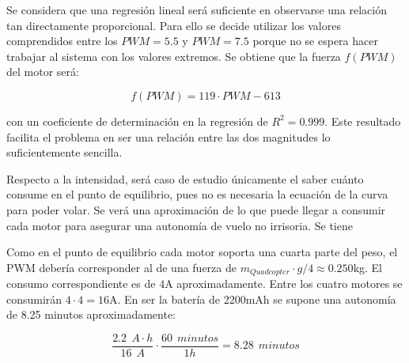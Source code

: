 \documentclass[twoside,11pt]{report}
\begin{document}
Se considera que una regresión lineal será suficiente en observarse una relación tan directamente proporcional. Para ello se decide utilizar los valores comprendidos entre los $PWM=5.5$ y $PWM=7.5$ porque no se espera hacer trabajar al sistema con los valores extremos.  Se obtiene que la fuerza $f(PWM)$ del motor será:

\begin{equation}
f(PWM)=119 \cdot PWM - 613
\end{equation}

con un coeficiente de determinación en la regresión de  $R^2=0.999$. Este resultado facilita el problema en ser una relación entre las dos magnitudes lo suficientemente sencilla.

Respecto a la intensidad, será caso de estudio únicamente el saber cuánto consume en el punto de equilibrio, pues no es necesaria la ecuación de la curva para poder volar. Se verá una aproximación de lo que puede llegar a consumir cada motor para asegurar una autonomía de vuelo no irrisoria. Se tiene 


\begin{figure}[ht]
\begin{center}
\end{center}
\end{figure}

Como en el punto de equilibrio cada motor soporta una cuarta parte del peso, el PWM debería corresponder al de una fuerza de $m_{Quadcopter}\cdot g/4\approx0.250$kg. El consumo correspondiente es de $4$A aproximadamente. Entre los cuatro motores se consumirán $4 \cdot 4=16$A. En ser la batería de 2200mAh se supone una autonomía de 8.25 minutos aproximadamente:

\begin{equation}
\frac{2.2 \>\> A \cdot h}{16\>\>A} \cdot \frac{60\>\> minutos}{1 h}=8.28 \>\> minutos
\end{equation} 
\end{document}
